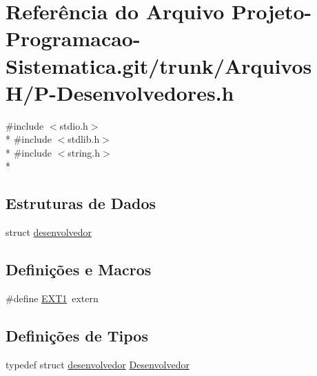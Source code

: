 \hypertarget{_p-_desenvolvedores_8h}{\section{Referência do Arquivo Projeto-\/\-Programacao-\/\-Sistematica.git/trunk/\-Arquivos H/\-P-\/\-Desenvolvedores.h}
\label{_p-_desenvolvedores_8h}
}
{\ttfamily \#include $<$stdio.\-h$>$}\\*
{\ttfamily \#include $<$stdlib.\-h$>$}\\*
{\ttfamily \#include $<$string.\-h$>$}\\*
\subsection*{Estruturas de Dados}
\begin{DoxyCompactItemize}
\item 
struct \hyperlink{structdesenvolvedor}{desenvolvedor}
\end{DoxyCompactItemize}
\subsection*{Definições e Macros}
\begin{DoxyCompactItemize}
\item 
\#define \hyperlink{_p-_desenvolvedores_8h_a1b19fbdd3be23e1bca939f6a02fb9223}{E\-X\-T1}~extern
\end{DoxyCompactItemize}
\subsection*{Definições de Tipos}
\begin{DoxyCompactItemize}
\item 
typedef struct \hyperlink{structdesenvolvedor}{desenvolvedor} \hyperlink{_p-_desenvolvedores_8h_a7a0dacce50a24c9428a7b4ad9d4d7c42}{Desenvolvedor}
\end{DoxyCompactItemize}
